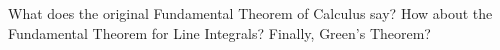 What does the original Fundamental Theorem of Calculus say?  How about the Fundamental Theorem for Line Integrals?  Finally, Green's Theorem?

